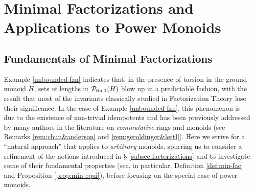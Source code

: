 \chapter{Minimal Factorizations and Applications to Power Monoids} \label{ch:minimal factorizations}
\section{Fundamentals of Minimal Factorizations}
\label{sec:minimal-factorizations}
%
	
%
Example \ref{unbounded-fzn} indicates that, in the presence of torsion in the ground monoid $H$, sets of lengths in $\mathcal{P}_{\textrm{fin}, 1}(H)$ blow up in a predictable fashion, with the result that most of the invariants classically studied in Factorization Theory lose their significance. 
In the case of Example \ref{unbounded-fzn}, this phenomenon is due to the existence of non-trivial idempotents and has been previously addressed by many authors in the literature on \emph{commutative} rings and monoids (see Remarks \ref{rem:chun&anderson} and \ref{rem:geroldinger&lettl}).
Here we strive for a ``natural approach'' that applies to \emph{arbitrary} monoids, spurring us to consider a refinement of the notions introduced in \S{ }\ref{subsec:factorizations} and to investigate some of their fundamental properties (see, in particular, Definition \ref{def:min-fac} and Proposition \ref{prop:min-equi}), before focusing on the special case of power monoids.

